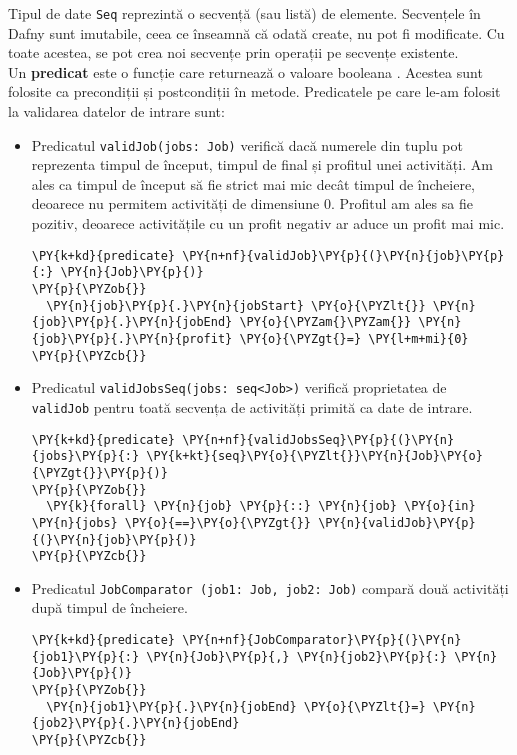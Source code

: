 Tipul de date \texttt{Seq} reprezintă o secvență (sau listă) de elemente. Secvențele în Dafny sunt imutabile, ceea ce înseamnă că odată create, nu pot fi modificate. Cu toate acestea, se pot crea noi secvențe prin operații pe secvențe existente.\\

Un \textbf{predicat} este o funcție care returnează o valoare booleana \cite{DBLP:series/natosec/KoenigL12}. Acestea sunt folosite ca precondiții și postcondiții în metode. Predicatele pe care le-am folosit la validarea datelor de intrare sunt:
\begin{itemize}
    \item Predicatul \texttt{validJob(jobs: Job)} verifică dacă numerele din tuplu pot reprezenta timpul de început, timpul de final și profitul unei activități. 
Am ales ca timpul de început să fie strict mai mic decât timpul de încheiere, deoarece nu permitem activități de dimensiune 0. 
Profitul am ales sa fie pozitiv, deoarece activitățile cu un profit negativ ar aduce un profit mai mic. 
\begin{Verbatim}[commandchars=\\\{\}, fontsize=\footnotesize]
\PY{k+kd}{predicate} \PY{n+nf}{validJob}\PY{p}{(}\PY{n}{job}\PY{p}{:} \PY{n}{Job}\PY{p}{)}
\PY{p}{\PYZob{}}
  \PY{n}{job}\PY{p}{.}\PY{n}{jobStart} \PY{o}{\PYZlt{}} \PY{n}{job}\PY{p}{.}\PY{n}{jobEnd} \PY{o}{\PYZam{}\PYZam{}} \PY{n}{job}\PY{p}{.}\PY{n}{profit} \PY{o}{\PYZgt{}=} \PY{l+m+mi}{0}
\PY{p}{\PYZcb{}} 
\end{Verbatim} 
    \item Predicatul \texttt{validJobsSeq(jobs: seq<Job>)} verifică proprietatea de \\\texttt{validJob} pentru toată secvența de activități primită ca date de intrare. \begin{Verbatim}[commandchars=\\\{\},fontsize=\footnotesize]
\PY{k+kd}{predicate} \PY{n+nf}{validJobsSeq}\PY{p}{(}\PY{n}{jobs}\PY{p}{:} \PY{k+kt}{seq}\PY{o}{\PYZlt{}}\PY{n}{Job}\PY{o}{\PYZgt{}}\PY{p}{)}
\PY{p}{\PYZob{}}
  \PY{k}{forall} \PY{n}{job} \PY{p}{::} \PY{n}{job} \PY{o}{in} \PY{n}{jobs} \PY{o}{==}\PY{o}{\PYZgt{}} \PY{n}{validJob}\PY{p}{(}\PY{n}{job}\PY{p}{)}
\PY{p}{\PYZcb{}}
\end{Verbatim} 
    \item Predicatul \texttt{JobComparator (job1: Job, job2: Job)} compară două activități după timpul de încheiere.\begin{Verbatim}[commandchars=\\\{\}, fontsize=\footnotesize]
\PY{k+kd}{predicate} \PY{n+nf}{JobComparator}\PY{p}{(}\PY{n}{job1}\PY{p}{:} \PY{n}{Job}\PY{p}{,} \PY{n}{job2}\PY{p}{:} \PY{n}{Job}\PY{p}{)}
\PY{p}{\PYZob{}}
  \PY{n}{job1}\PY{p}{.}\PY{n}{jobEnd} \PY{o}{\PYZlt{}=} \PY{n}{job2}\PY{p}{.}\PY{n}{jobEnd}
\PY{p}{\PYZcb{}}
\end{Verbatim}


\end{itemize}
